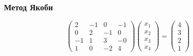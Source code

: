 \documentclass[10pt]{beamer}
\begin{document}
\begin{frame}[fragile]
\frametitle{Метод Якоби}

$$
\begin{pmatrix}
2 & -1 & 0 & -1 \\
0 & 2 & -1 & 0 \\
-1 & 1 & 3 & -0 \\
1 & 0 & -2 & 4 
\end{pmatrix}
\begin{pmatrix}
x_1 \\
x_2 \\	
x_3 \\
x_4
\end{pmatrix}
=
\begin{pmatrix}
4 \\
3 \\
2 \\
1
\end{pmatrix}
$$
\end{frame}
\end{document}
